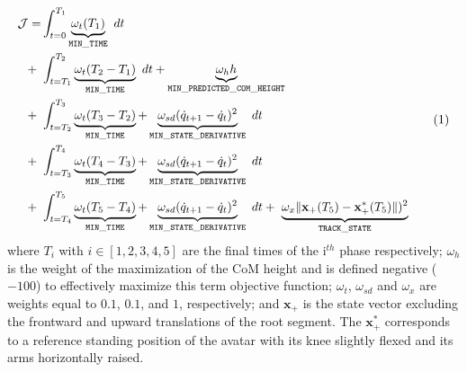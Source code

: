 \[ 
\resizebox{0.90\columnwidth}{!}{$ 
\begin{aligned}
\mathcal{J} = 
  &\int_{t=0}^{T_1}\underbrace{\omega_{t} (T_1)}_{\mathtt{MIN\_TIME}}~dt\\
  +~&\int_{t=T_1}^{T_2}\underbrace{\omega_{t} (T_2 - T_1)}_{\mathtt{MIN\_TIME}}~dt + \underbrace{\omega_h h}_{\mathtt{MIN\_PREDICTED\_COM\_HEIGHT}}\\
  +~&\int_{t=T_2}^{T_3}\underbrace{\omega_{t} (T_3 - T_2)}_{\mathtt{MIN\_TIME}} + \underbrace{\omega_{sd} (\dot{q}_{t+1} - \dot{q}_t)^2}_{\mathtt{MIN\_STATE\_DERIVATIVE}}~dt\\
  +~&\int_{t=T_3}^{T_4}\underbrace{\omega_{t} (T_4 - T_3)}_{\mathtt{MIN\_TIME}} + \underbrace{\omega_{sd} (\dot{q}_{t+1} - \dot{q}_t)^2}_{\mathtt{MIN\_STATE\_DERIVATIVE}}~dt\\
  +~&\int_{t=T_4}^{T_5}\underbrace{\omega_{t} (T_5 - T_4)}_{\mathtt{MIN\_TIME}} + \underbrace{\omega_{sd} (\dot{q}_{t+1} - \dot{q}_t)^2}_{\mathtt{MIN\_STATE\_DERIVATIVE}}~dt +~\underbrace{\omega_{x} \| \mathbf{x}_+(T_5) - \mathbf{x}_+^*(T_5)\| )^2}_{\mathtt{TRACK\_STATE}}\\
\end{aligned} 
$}  
\addtag  
\label{eq:cost_jumper}
\]
where $T_i$ with $i \in [1, 2, 3, 4, 5]$ are the final times of the i$^{th}$ phase respectively; 
$\omega_h$ is the weight of the maximization of the CoM height and is defined negative ($-100$) to effectively maximize this term objective function; 
$\omega_t$, $\omega_{sd}$ and $\omega_x$ are weights equal to $0.1$, $0.1$, and $1$, respectively; 
and $\mathbf{x}_+$ is the state vector excluding the frontward and upward translations of the root segment. 
The $\mathbf{x}_+^*$ corresponds to a reference standing position of the avatar with its knee slightly flexed and its arms horizontally raised.



